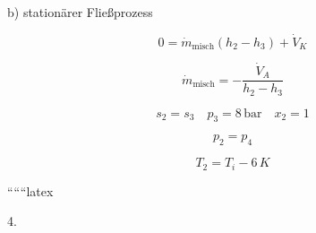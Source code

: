 b) stationärer Fließprozess

\[
0 = \dot{m}_{\text{misch}} (h_2 - h_3) + \dot{V}_K
\]

\[
\dot{m}_{\text{misch}} = - \frac{\dot{V}_A}{h_2 - h_3}
\]

\[
s_2 = s_3 \quad p_3 = 8 \, \text{bar} \quad x_2 = 1
\]

\[
p_2 = p_4
\]

\[
T_2 = T_i - 6 \, K
\]

``````latex


4.
